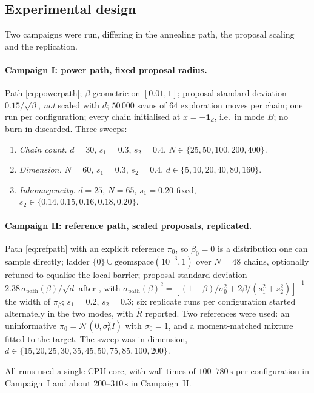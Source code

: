 \subsection{Experimental design}
\label{sec:design}

Two campaigns were run, differing in the annealing path, the proposal scaling
and the replication.

\paragraph{Campaign I: power path, fixed proposal radius.}
Path \eqref{eq:powerpath}; $\beta$ geometric on $[0.01,1]$; proposal standard
deviation $0.15/\sqrt\beta$, \emph{not} scaled with $d$; $50\,000$ scans of $64$
exploration moves per chain; one run per configuration; every chain initialised
at $x=-\mathbf1_d$, i.e.\ in mode $B$; no burn-in discarded. Three sweeps:
\begin{enumerate}
  \item[(I.a)] \emph{Chain count.} $d=30$, $s_1=0.3$, $s_2=0.4$,
  $N\in\{25,50,100,200,400\}$.
  \item[(I.b)] \emph{Dimension.} $N=60$, $s_1=0.3$, $s_2=0.4$,
  $d\in\{5,10,20,40,80,160\}$.
  \item[(I.c)] \emph{Inhomogeneity.} $d=25$, $N=65$, $s_1=0.20$ fixed,
  $s_2\in\{0.14,0.15,0.16,0.18,0.20\}$.
\end{enumerate}

\paragraph{Campaign II: reference path, scaled proposals, replicated.}
Path \eqref{eq:refpath} with an explicit reference $\pi_0$, so $\beta_0=0$ is a
distribution one can sample directly; ladder
$\{0\}\cup\mathrm{geomspace}(10^{-3},1)$ over $N=48$ chains, optionally retuned to
equalise the local barrier; proposal standard deviation
$2.38\,\sigma_{\mathrm{path}}(\beta)/\sqrt d$ after \citet{roberts1997}, with
$\sigma_{\mathrm{path}}(\beta)^2=[(1-\beta)/\sigma_0^2+2\beta/(s_1^2+s_2^2)]^{-1}$
the width of $\pi_\beta$; $s_1=0.2$, $s_2=0.3$; six replicate runs per
configuration started alternately in the two modes, with $\hat R$ reported. Two
references were used: an uninformative $\pi_0=\mathcal N(0,\sigma_0^2I)$ with
$\sigma_0=1$, and a moment-matched mixture fitted to the target. The sweep was in
dimension, $d\in\{15,20,25,30,35,45,50,75,85,100,200\}$.

All runs used a single CPU core, with wall times of $100$--$780\,\mathrm{s}$ per
configuration in Campaign~I and about $200$--$310\,\mathrm{s}$ in Campaign~II.


